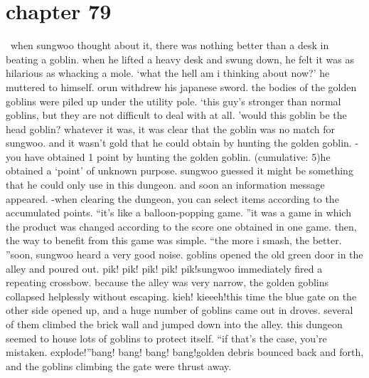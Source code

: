 \section{chapter 79}






 when sungwoo thought about it, there was nothing better than a desk in beating a goblin.
when he lifted a heavy desk and swung down, he felt it was as hilarious as whacking a mole.
‘what the hell am i thinking about now?’ he muttered to himself.
orun withdrew his japanese sword.
 the bodies of the golden goblins were piled up under the utility pole.
‘this guy’s stronger than normal goblins, but they are not difficult to deal with at all.
’would this goblin be the head goblin? whatever it was, it was clear that the goblin was no match for sungwoo.
 and it wasn’t gold that he could obtain by hunting the golden goblin.
-you have obtained 1 point by hunting the golden goblin.
 (cumulative: 5)he obtained a ‘point’ of unknown purpose.
 sungwoo guessed it might be something that he could only use in this dungeon.
 and soon an information message appeared.
-when clearing the dungeon, you can select items according to the accumulated points.
“it’s like a balloon-popping game.
”it was a game in which the product was changed according to the score one obtained in one game.
 then, the way to benefit from this game was simple.
“the more i smash, the better.
”soon, sungwoo heard a very good noise.
 goblins opened the old green door in the alley and poured out.
pik! pik! pik! pik! pik!sungwoo immediately fired a repeating crossbow.
 because the alley was very narrow, the golden goblins collapsed helplessly without escaping.
kieh! kieeeh!this time the blue gate on the other side opened up, and a huge number of goblins came out in droves.
 several of them climbed the brick wall and jumped down into the alley.
this dungeon seemed to house lots of goblins to protect itself.
“if that’s the case, you’re mistaken.
 explode!”bang! bang! bang! bang!golden debris bounced back and forth, and the goblins climbing the gate were thrust away.

